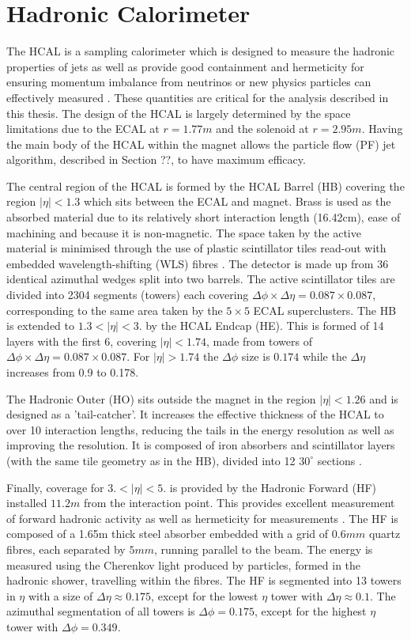 \section{Hadronic Calorimeter}

The HCAL is a sampling calorimeter which is designed to measure the hadronic properties of jets as well as provide good 
containment and hermeticity for ensuring momentum imbalance from neutrinos or new physics particles can effectively measured \cite{hcal_tdr}.
These quantities are critical for the analysis described in this thesis.
The design of the HCAL is largely determined by the space limitations due to the ECAL at $r = 1.77 m$ and the solenoid at $r = 2.95 m$.
Having the main body of the HCAL within the magnet allows the particle flow (PF) jet algorithm, described in Section ??, to have maximum 
efficacy. 

The central region of the HCAL is formed by the HCAL Barrel (HB) covering the region $|\eta| < 1.3$ which sits between
the ECAL and magnet. Brass is used as the absorbed material due to its relatively short interaction length (16.42cm), ease of machining 
and because it is non-magnetic. The space taken by the active material is minimised through the use of plastic scintillator tiles
read-out with embedded wavelength-shifting (WLS) fibres \cite{CMS}. The detector is made up from 36 identical azimuthal wedges split into two barrels.
The active scintillator tiles are divided into 2304 segments (towers) each covering $\Delta\phi \times \Delta\eta = 0.087 × 0.087$, corresponding to the 
same area taken by the $5\times5$ ECAL superclusters. The HB is extended to $ 1.3 < |\eta| < 3.$ by the HCAL Endcap (HE). This is formed of 14 layers 
with the first 6, covering  $|\eta| < 1.74$, made from towers of $\Delta\phi \times \Delta\eta = 0.087 × 0.087$. For $|\eta| > 1.74$ the $\Delta\phi$
size is $0.174$ while the $\Delta\eta$ increases from 0.9 to 0.178.

The Hadronic Outer (HO) sits outside the magnet in the region $|\eta| < 1.26$ and is designed as a 'tail-catcher'.
It increases the effective thickness of the HCAL to over 10 interaction lengths, reducing the tails in the energy resolution
as well as improving the \met resolution. It is composed of iron absorbers and scintillator layers (with the same tile geometry as in the HB), divided into 
12 $30^\circ$ sections \cite{hcal_tdr}. 

Finally, coverage for $3. < |\eta| < 5.$ is provided by the Hadronic Forward (HF) installed $11.2 m$ from the interaction point. This provides
excellent measurement of forward hadronic activity as well as hermeticity for \met measurements \cite{hcal_tdr}. The HF is composed of a 1.65m thick steel absorber 
embedded with a grid of $0.6 mm$ quartz fibres, each separated by $5mm$, running parallel to the beam. The energy is measured using the Cherenkov
light produced by particles, formed in the hadronic shower, travelling within the fibres. The HF is segmented into 13 towers in $\eta$ with a
size of $\Delta\eta \approx 0.175$, except for the lowest $\eta$ tower with $\Delta\eta \approx 0.1$. The azimuthal segmentation of all towers is 
$\Delta\phi = 0.175$, except for the highest $\eta$ tower with $\Delta\phi = 0.349$.

